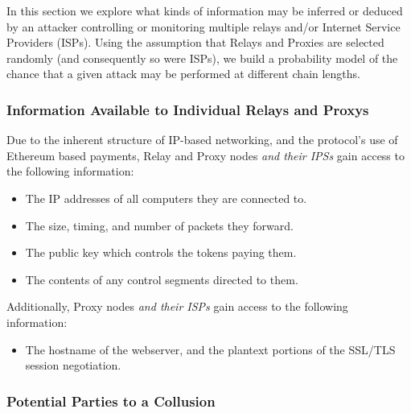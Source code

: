 

In this section we explore what kinds of information may be inferred
or deduced by an attacker controlling or monitoring multiple relays
and/or Internet Service Providers (ISPs). Using the assumption that
Relays and Proxies are selected randomly (and consequently so were
ISPs), we build a probability model of the chance that a given attack
may be performed at different chain lengths.

\subsubsection*{Information Available to Individual Relays and Proxys}
\label{relay-proxy-info-known}

Due to the inherent structure of IP-based networking, and the
\Orchid{} protocol's use of Ethereum based payments, Relay and Proxy
nodes \emph{and their IPSs} gain access to the following information:

\begin{itemize}
\item The IP addresses of all computers they are connected to.
\item The size, timing, and number of packets they forward.
\item The public key which controls the tokens paying them.
\item The contents of any control segments directed to them.
\end{itemize}

Additionally, Proxy nodes \emph{and their ISPs} gain access to the
following information:

\begin{itemize}
\item The hostname of the webserver, and the plantext portions of the
  SSL/TLS session negotiation.
\end{itemize}

\subsubsection*{Potential Parties to a Collusion}
\label{sec:collusion}

